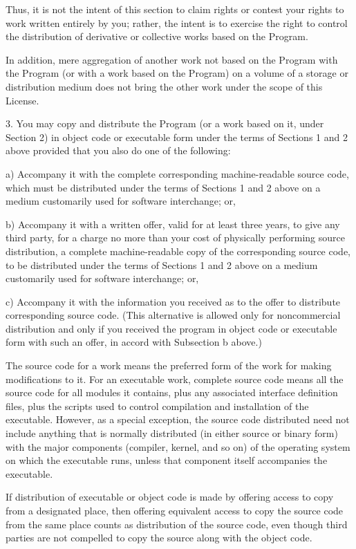 \documentclass{doc}
\begin{document}
Thus, it is not the intent of this section to claim rights or contest
your rights to work written entirely by you; rather, the intent is to
exercise the right to control the distribution of derivative or
collective works based on the Program.

In addition, mere aggregation of another work not based on the Program
with the Program (or with a work based on the Program) on a volume of
a storage or distribution medium does not bring the other work under
the scope of this License.

  3. You may copy and distribute the Program (or a work based on it,
under Section 2) in object code or executable form under the terms of
Sections 1 and 2 above provided that you also do one of the following:

    a) Accompany it with the complete corresponding machine-readable
    source code, which must be distributed under the terms of Sections
    1 and 2 above on a medium customarily used for software interchange; or,

    b) Accompany it with a written offer, valid for at least three
    years, to give any third party, for a charge no more than your
    cost of physically performing source distribution, a complete
    machine-readable copy of the corresponding source code, to be
    distributed under the terms of Sections 1 and 2 above on a medium
    customarily used for software interchange; or,

    c) Accompany it with the information you received as to the offer
    to distribute corresponding source code.  (This alternative is
    allowed only for noncommercial distribution and only if you
    received the program in object code or executable form with such
    an offer, in accord with Subsection b above.)

The source code for a work means the preferred form of the work for
making modifications to it.  For an executable work, complete source
code means all the source code for all modules it contains, plus any
associated interface definition files, plus the scripts used to
control compilation and installation of the executable.  However, as a
special exception, the source code distributed need not include
anything that is normally distributed (in either source or binary
form) with the major components (compiler, kernel, and so on) of the
operating system on which the executable runs, unless that component
itself accompanies the executable.

If distribution of executable or object code is made by offering
access to copy from a designated place, then offering equivalent
access to copy the source code from the same place counts as
distribution of the source code, even though third parties are not
compelled to copy the source along with the object code.
\end{document}
